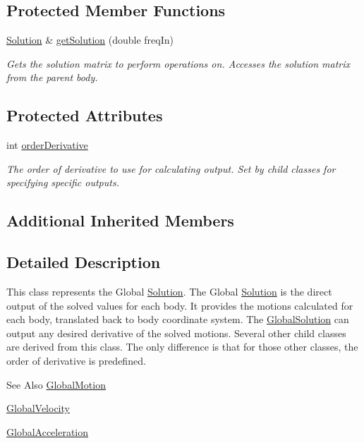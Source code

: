\subsection*{Protected Member Functions}
\begin{DoxyCompactItemize}
\item 
\hyperlink{classosea_1_1ofreq_1_1_solution}{Solution} \& \hyperlink{classosea_1_1ofreq_1_1_global_solution_a43a8caad9f88e3b468c3e9a364b45500}{get\-Solution} (double freq\-In)
\begin{DoxyCompactList}\small\item\em Gets the solution matrix to perform operations on. Accesses the solution matrix from the parent body. \end{DoxyCompactList}\end{DoxyCompactItemize}
\subsection*{Protected Attributes}
\begin{DoxyCompactItemize}
\item 
\hypertarget{classosea_1_1ofreq_1_1_global_solution_a935843ad9f4fd2de2a2ec407de45a20d}{int \hyperlink{classosea_1_1ofreq_1_1_global_solution_a935843ad9f4fd2de2a2ec407de45a20d}{order\-Derivative}}\label{classosea_1_1ofreq_1_1_global_solution_a935843ad9f4fd2de2a2ec407de45a20d}

\begin{DoxyCompactList}\small\item\em The order of derivative to use for calculating output. Set by child classes for specifying specific outputs. \end{DoxyCompactList}\end{DoxyCompactItemize}
\subsection*{Additional Inherited Members}


\subsection{Detailed Description}
This class represents the Global \hyperlink{classosea_1_1ofreq_1_1_solution}{Solution}. The Global \hyperlink{classosea_1_1ofreq_1_1_solution}{Solution} is the direct output of the solved values for each body. It provides the motions calculated for each body, translated back to body coordinate system. The \hyperlink{classosea_1_1ofreq_1_1_global_solution}{Global\-Solution} can output any desired derivative of the solved motions. Several other child classes are derived from this class. The only difference is that for those other classes, the order of derivative is predefined. \begin{DoxySeeAlso}{See Also}
\hyperlink{classosea_1_1ofreq_1_1_global_motion}{Global\-Motion} 

\hyperlink{classosea_1_1ofreq_1_1_global_velocity}{Global\-Velocity} 

\hyperlink{classosea_1_1ofreq_1_1_global_acceleration}{Global\-Acceleration} 
\end{DoxySeeAlso}


